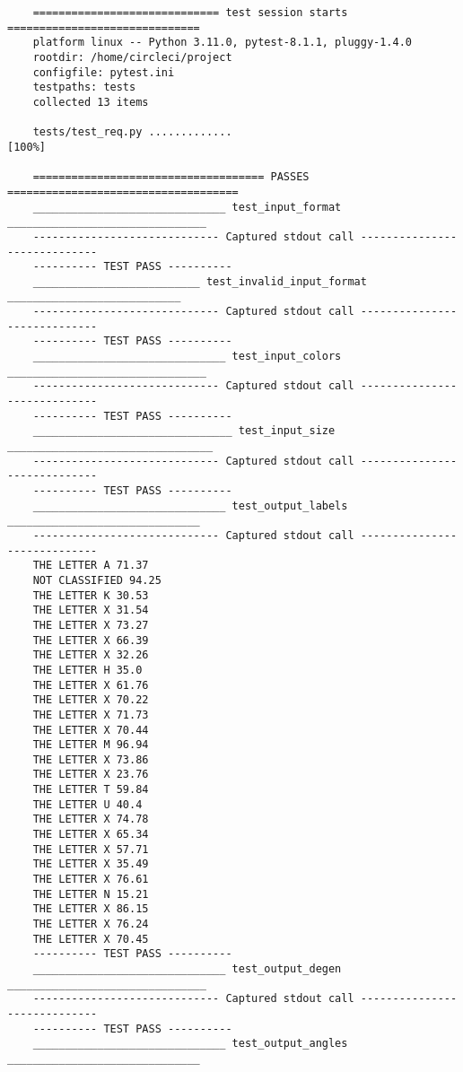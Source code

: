 \documentclass[12pt, titlepage]{article}
\begin{document}
\begin{small} 
  \begin{verbatim} 
    ============================= test session starts ==============================
    platform linux -- Python 3.11.0, pytest-8.1.1, pluggy-1.4.0
    rootdir: /home/circleci/project
    configfile: pytest.ini
    testpaths: tests
    collected 13 items                                                             
    
    tests/test_req.py .............                                          [100%]
    
    ==================================== PASSES ====================================
    ______________________________ test_input_format _______________________________
    ----------------------------- Captured stdout call -----------------------------
    ---------- TEST PASS ----------
    __________________________ test_invalid_input_format ___________________________
    ----------------------------- Captured stdout call -----------------------------
    ---------- TEST PASS ----------
    ______________________________ test_input_colors _______________________________
    ----------------------------- Captured stdout call -----------------------------
    ---------- TEST PASS ----------
    _______________________________ test_input_size ________________________________
    ----------------------------- Captured stdout call -----------------------------
    ---------- TEST PASS ----------
    ______________________________ test_output_labels ______________________________
    ----------------------------- Captured stdout call -----------------------------
    THE LETTER A 71.37
    NOT CLASSIFIED 94.25
    THE LETTER K 30.53
    THE LETTER X 31.54
    THE LETTER X 73.27
    THE LETTER X 66.39
    THE LETTER X 32.26
    THE LETTER H 35.0
    THE LETTER X 61.76
    THE LETTER X 70.22
    THE LETTER X 71.73
    THE LETTER X 70.44
    THE LETTER M 96.94
    THE LETTER X 73.86
    THE LETTER X 23.76
    THE LETTER T 59.84
    THE LETTER U 40.4
    THE LETTER X 74.78
    THE LETTER X 65.34
    THE LETTER X 57.71
    THE LETTER X 35.49
    THE LETTER X 76.61
    THE LETTER N 15.21
    THE LETTER X 86.15
    THE LETTER X 76.24
    THE LETTER X 70.45
    ---------- TEST PASS ----------
    ______________________________ test_output_degen _______________________________
    ----------------------------- Captured stdout call -----------------------------
    ---------- TEST PASS ----------
    ______________________________ test_output_angles ______________________________

\end{verbatim}
\end{small}
\end{document}
